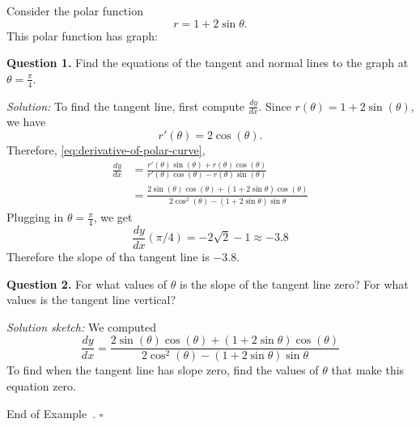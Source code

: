\documentclass[10pt]{article}
\theoremstyle{definition}
\newtheorem{example}[theorem]{Example}
\renewenvironment{example}
{\begin{oldexample}}
  {\par\smallskip\hfill   End of Example~\theexample. $\square$    \par\end{oldexample}}
\newcommand{\fl}{\noindent\textbf} %
\newcommand{\1}[1]{\textbf{1}_{\left[#1\right]}} %
\begin{document}
\begin{example}
  Consider the polar function
  \begin{equation*}
    r = 1+2\sin \theta.
  \end{equation*}
  This polar function has graph:
  \begin{center}
  \end{center}

  \fl{Question 1.} Find the equations of the tangent and normal lines to the graph at $\theta=\frac{\pi}{4}$.

  \noindent\textit{Solution:} To find the tangent line, first compute $\frac{dy}{dx}$.  Since $r(\theta) = 1+2\sin(\theta)$, we
  have
  \begin{equation*}
    r'(\theta) = 2\cos(\theta).
  \end{equation*}
  Therefore, \cref{eq:derivative-of-polar-curve}, 
  \begin{align*}
    \frac{dy}{dx} 
    &= \frac{r'(\theta)\sin(\theta) + r(\theta)\cos(\theta)}{r'(\theta)\cos(\theta)-r(\theta)\sin(\theta)}\\
    &= \frac{2\sin(\theta)\cos(\theta)+ (1+2\sin\theta)\cos(\theta)}{2\cos^{2}(\theta)- (1+2\sin \theta)\sin \theta}
  \end{align*}
  Plugging in $\theta=\frac{\pi}{4}$, we get
  \begin{equation*}
    \frac{dy}{dx}(\pi/4) = -2 \sqrt{2} -1 \approx -3.8
  \end{equation*}
  Therefore the slope of tha tangent line is $-3.8$.

  \fl{Question 2.} For what values of $\theta$ is the slope of the tangent
  line zero? For what values is the tangent line vertical?

  \noindent\textit{Solution sketch:} We computed
  \begin{equation*}
    \frac{dy}{dx} = \frac{2\sin(\theta)\cos(\theta)+ (1+2\sin\theta)\cos(\theta)}{2\cos^{2}(\theta)- (1+2\sin \theta)\sin \theta}
  \end{equation*}
  To find when the tangent line has slope zero, find the values of $\theta$
  that make this equation zero.


\end{example}
\end{document}
